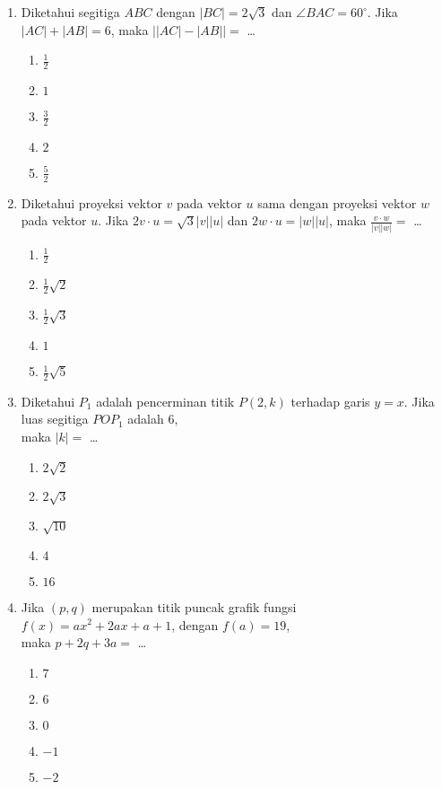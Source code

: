 \documentclass[A4,12PT, english, twocolumn]{journal}
\begin{document}
\begin{enumerate}
\item Diketahui segitiga $ABC$ dengan $\left|BC \right| = 2\sqrt{3}$ dan $\angle BAC = 60^{\circ}$. Jika $\left|AC \right| + \left|AB \right| = 6$, maka $\left|{\left|AC \right| - \left|AB \right|}\right| =$ \dots
	\begin{enumerate}
		\item $\frac{1}{2}$
		\item $1$
		\item $\frac{3}{2}$
		\item $2$
		\item $\frac{5}{2}$
	\end{enumerate}
	
\item Diketahui proyeksi vektor $v$ pada vektor $u$ sama dengan proyeksi vektor $w$ pada vektor $u$. Jika $2v \cdot u = \sqrt{3}\left|v \right| \left|u \right|$ dan $2w \cdot u = \left|w \right| \left|u \right|$, maka $\frac{v \cdot w}{\left|v \right| \left|w \right|} =$ \dots
   \begin{enumerate}
        \item $\frac{1}{2}$
        \item $\frac{1}{2} \sqrt{2}$
        \item $\frac{1}{2} \sqrt{3}$
        \item $1$
        \item $\frac{1}{2} \sqrt{5}$
   \end{enumerate}
   
\item Diketahui $P_1$ adalah pencerminan titik $P\left(2,k \right)$ terhadap garis $y=x$. Jika luas segitiga $POP_1$ adalah 6, \\ maka $\left|k \right| =$ \dots
    \begin{enumerate}
        \item $2 \sqrt{2}$
        \item $2 \sqrt{3}$
        \item $\sqrt{10}$
        \item $4$
        \item $16$
    \end{enumerate}
  
\item Jika $\left(p,q \right)$ merupakan titik puncak grafik fungsi \\ $f \left(x \right) = ax^2+2ax+a+1$, dengan $f \left(a \right) = 19$, \\ maka $p+2q+3a =$ \dots
    \begin{enumerate}
        \item $7$
        \item $6$
        \item $0$
        \item $-1$
        \item $-2$
    \end{enumerate}
    

\end{enumerate}
\end{document}
